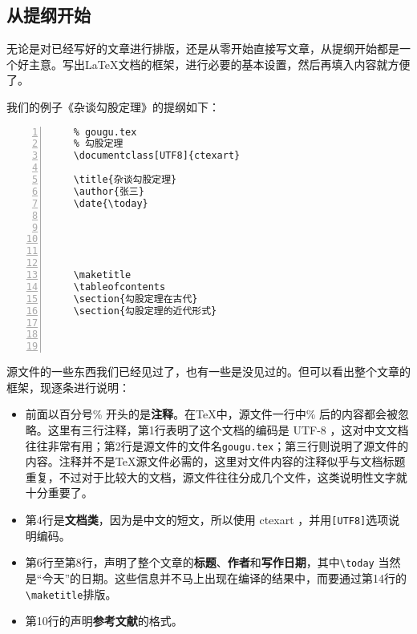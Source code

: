 \subsection{从提纲开始}

无论是对已经写好的文章进行排版，还是从零开始直接写文章，从提纲开始都是一个好主意。写出\LaTeX 文档的框架，进行必要的基本设置，然后再填入内容就方便了。

我们的例子《杂谈勾股定理》的提纲如下：

\begin{lstlisting}[numbers=left]
    % -*- coding: UTF-8 -*-
    % gougu.tex
    % 勾股定理
    \documentclass[UTF8]{ctexart}

    \title{杂谈勾股定理}
    \author{张三}
    \date{\today}

    

    

    \maketitle
    \tableofcontents
    \section{勾股定理在古代}
    \section{勾股定理的近代形式}
    

    
\end{lstlisting}

源文件的一些东西我们已经见过了，也有一些是没见过的。但可以看出整个文章的框架，现逐条进行说明：

\begin{itemize}
    \item 前面以百分号\% 开头的是\textbf{注释}。在\TeX 中，源文件一行中\% 后的内容都会被忽略。这里有三行注释，第1行表明了这个文档的编码是 UTF-8 ，这对中文文档往往非常有用；第2行是源文件的文件名\verb|gougu.tex|；第三行则说明了源文件的内容。注释并不是\TeX 源文件必需的，这里对文件内容的注释似乎与文档标题重复，不过对于比较大的文档，源文件往往分成几个文件，这类说明性文字就十分重要了。
    \item 第4行是\textbf{文档类}，因为是中文的短文，所以使用 ctexart ，并用\verb|[UTF8]|选项说明编码。
    \item 第6行至第8行，声明了整个文章的\textbf{标题}、\textbf{作者}和\textbf{写作日期}，其中\verb|\today| 当然是“今天”的日期。这些信息并不马上出现在编译的结果中，而要通过第14行的\verb|\maketitle|排版。
    \item 第10行的\verb||声明\textbf{参考文献}的格式。
\end{itemize}

